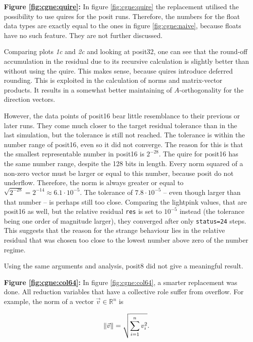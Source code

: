 \documentclass{article}
\theoremstyle{plain} %
\theoremstyle{convention} %
\theoremstyle{remark} %
\def\code#1{\texttt{#1}}
\numberwithin{equation}{section}
\begin{document}
\textbf{Figure \ref{fig:cgne:quire}:} In figure \ref{fig:cgne:quire} the replacement utilised the possibility to use \glspl{quire} for the posit runs. Therefore, the numbers for the float data types are exactly equal to the ones in figure \ref{fig:cgne:naive}, because floats have no such feature. They are not further discussed.

Comparing plots \textit{1c} and \textit{2c} and looking at \gls{posit32}, one can see that the round-off accumulation in the residual due to its recursive calculation is slightly better than without using the \gls{quire}. This makes sense, because \glspl{quire} introduce deferred rounding. This is exploited in the calculation of norms and matrix-vector products. It results in a somewhat better maintaining of $A$-orthogonality for the direction vectors.

However, the data points of \gls{posit16} bear little resemblance to their previous or later runs. They come much closer to the target residual tolerance than in the last simulation, but the tolerance is still not reached. The tolerance is within the number range of \gls{posit16}, even so it did not converge. The reason for this is that the smallest representable number in \gls{posit16} is $2^{-28}$. The \gls{quire} for \gls{posit16} has the same number range, despite the \num{128} bits in length. Every norm squared of a non-zero vector must be larger or equal to this number, because posit do not underflow. Therefore, the norm is always greater or equal to $\sqrt{2^{-28}} = 2^{-14} \approx 6.1 \cdot 10^{-5}$. The tolerance of $7.8 \cdot 10^{-5}$ -- even though larger than that number -- is perhaps still too close. Comparing the \textcolor{clightpink}{lightpink} values, that are \gls{posit16} as well, but the relative residual \code{res} is set to $10^{-5}$ instead (the tolerance being one order of magnitude larger), they converged after only \code{status=24} steps. This suggests that the reason for the strange behaviour lies in the relative residual that was chosen too close to the lowest number above zero of the number regime.

Using the same arguments and analysis, \gls{posit8} did not give a meaningful result.

\textbf{Figure \ref{fig:cgne:col64}:} In figure \ref{fig:cgne:col64}, a smarter replacement was done. All reduction variables that have a collective role suffer from overflow. For example, the norm of a vector $\vec{v} \in \mathbb{R}^n$ is 

\begin{align*}
    \norm{\vec{v}} = \sqrt{ \sum_{i=1}^{n} v_i^2 }.
\end{align*}
\end{document}
